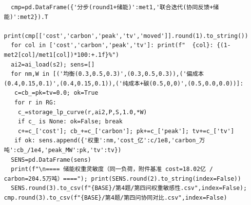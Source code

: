 \documentclass{article}
\begin{document}
\begin{lstlisting}
  cmp=pd.DataFrame({'分步(round1+储能)':met1,'联合迭代(协同反馈+储能)':met2}).T
  print(cmp[['cost','carbon','peak','tv','moved']].round(1).to_string())
  for col in ['cost','carbon','peak','tv']: print(f"  {col}: {(1-met2[col]/met1[col])*100:+.1f}%")
  ai2=ai_load(s2); sens=[]
  for nm,W in [('均衡(0.3,0.5,0.3)',(0.3,0.5,0.3)),('偏成本(0.4,0.15,0.1)',(0.4,0.15,0.1)),('纯成本+碳(0.5,0,0)',(0.5,0.0,0.0))]:
   c=cb_=pk=tv=0.0; ok=True
   for r in RG:
    c_=storage_lp_curve(r,ai2,P,S,1.0,*W)
    if c_ is None: ok=False; break
    c+=c_['cost']; cb_+=c_['carbon']; pk+=c_['peak']; tv+=c_['tv']
   if ok: sens.append({'权重':nm,'cost_亿':c/1e8,'carbon_万吨':cb_/1e4,'peak_MW':pk,'tv':tv})
  SENS=pd.DataFrame(sens)
  print(f"\n==== 储能权重灵敏度（同一负荷，附件基准 cost=18.02亿 / carbon=204.5万吨）===="); print(SENS.round(2).to_string(index=False))
  SENS.round(3).to_csv(f"{BASE}/第4题/第四问权重敏感性.csv",index=False); cmp.round(3).to_csv(f"{BASE}/第4题/第四问协同对比.csv",index=False)
\end{lstlisting}
\end{document}
